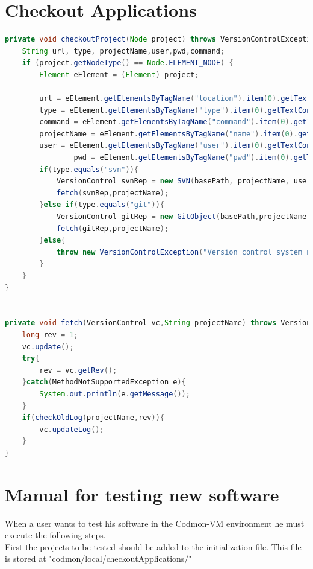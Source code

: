 \documentclass{article}
\newcommand{\project}{Codmon-VM}
\begin{document}
\newpage
\section{Checkout Applications}
\label{AppendixD}


\begin{lstlisting}[frame=single ,language=Java,showstringspaces=false]
private void checkoutProject(Node project) throws VersionControlException{
	String url, type, projectName,user,pwd,command;
	if (project.getNodeType() == Node.ELEMENT_NODE) {
		Element eElement = (Element) project;

		url = eElement.getElementsByTagName("location").item(0).getTextContent();
		type = eElement.getElementsByTagName("type").item(0).getTextContent();
		command = eElement.getElementsByTagName("command").item(0).getTextContent();
		projectName = eElement.getElementsByTagName("name").item(0).getTextContent();
		user = eElement.getElementsByTagName("user").item(0).getTextContent();
                pwd = eElement.getElementsByTagName("pwd").item(0).getTextContent();	
		if(type.equals("svn")){
			VersionControl svnRep = new SVN(basePath, projectName, user,pwd,url,command);
			fetch(svnRep,projectName);				
		}else if(type.equals("git")){			
			VersionControl gitRep = new GitObject(basePath,projectName,url,user,pwd);
			fetch(gitRep,projectName);				
		}else{
			throw new VersionControlException("Version control system not found");
		}
	}	
}

	
private void fetch(VersionControl vc,String projectName) throws VersionControlException{
	long rev =-1;
	vc.update();
	try{	
		rev = vc.getRev();
	}catch(MethodNotSupportedException e){
		System.out.println(e.getMessage());
	}
	if(checkOldLog(projectName,rev)){
		vc.updateLog();
	}
}
\end{lstlisting}


\newpage
\section{Manual for testing new software}
\label{AppendixE}

When a user wants to test his software in the \project{} environment he must execute the following steps.\\ 

\noindent First the projects to be tested should be added to the initialization file. This file is stored at "codmon/local/checkoutApplications/"
\end{document}
